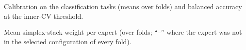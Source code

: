 \begin{table}[t]
\centering
\caption{Calibration on the classification tasks (means over folds) and balanced accuracy at the inner-CV threshold.}
\label{tab:calib}
\begin{adjustbox}{max width=\textwidth}

\end{adjustbox}
\end{table}

\begin{table}[t]
\centering
\caption{Mean simplex-stack weight per expert (over folds; ``--'' where the expert was not in the selected configuration of every fold).}
\label{tab:weights}
\begin{adjustbox}{max width=\textwidth}

\end{adjustbox}
\end{table}
